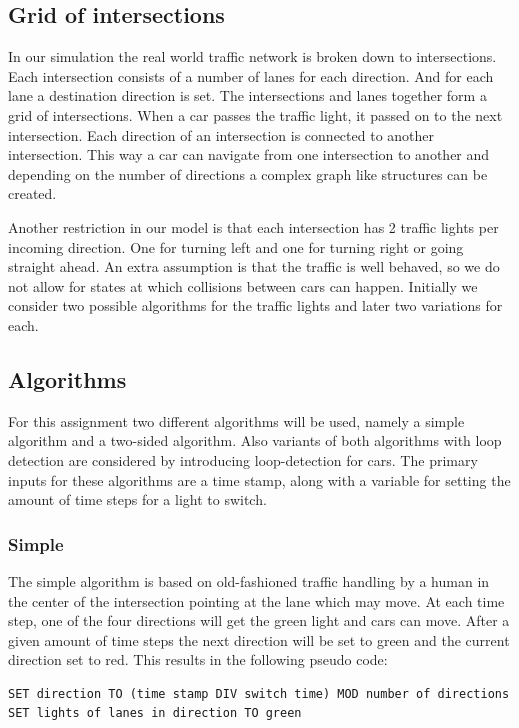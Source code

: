 \documentclass[a4paper,11pt]{article}
\begin{document}
\subsection{Grid of intersections}
In our simulation the real world traffic network is broken down to intersections.
Each intersection consists of a number of lanes for each direction.
And for each lane a destination direction is set.
The intersections and lanes together form a grid of intersections.
When a car passes the traffic light, it passed on to the next intersection.
Each direction of an intersection is connected to another intersection.
This way a car can navigate from one intersection to another and depending on the number of directions a complex graph like structures can be created.

Another restriction in our model is that each intersection has 2 traffic lights per incoming direction.
One for turning left and one for turning right or going straight ahead.
An extra assumption is that the traffic is well behaved, so we do not allow for states at which collisions between cars can happen.
Initially we consider two possible algorithms for the traffic lights and later two variations for each.

\subsection{Algorithms}

For this assignment two different algorithms will be used, namely a simple algorithm and a two-sided algorithm.
Also variants of both algorithms with loop detection are considered by introducing loop-detection for cars.
The primary inputs for these algorithms are a time stamp, along with a variable for setting the amount of time steps for a light to switch.

\subsubsection*{Simple}
The simple algorithm is based on old-fashioned traffic handling by a human in the center of the intersection pointing at the lane which may move.
At each time step, one of the four directions will get the green light and cars can move.
After a given amount of time steps the next direction will be set to green and the current direction set to red.
This results in the following pseudo code:

\begin{lstlisting}
SET direction TO (time stamp DIV switch time) MOD number of directions
SET lights of lanes in direction TO green
\end{lstlisting}
\end{document}
